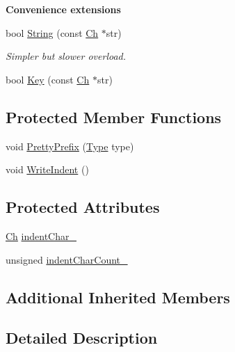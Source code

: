 \begin{Indent}{\bf Convenience extensions}\par
\begin{DoxyCompactItemize}
\item 
bool \hyperlink{classPrettyWriter_ac6ef0185174838b7034b4183013ee073}{String} (const \hyperlink{classPrettyWriter_ae5f474c0f087932d795c1cb4b9d0c312}{Ch} $\ast$str)
\begin{DoxyCompactList}\small\item\em Simpler but slower overload. \end{DoxyCompactList}\item 
bool \hyperlink{classPrettyWriter_a0a4859ad940668cf33d18b144e5e1cdd}{Key} (const \hyperlink{classPrettyWriter_ae5f474c0f087932d795c1cb4b9d0c312}{Ch} $\ast$str)
\end{DoxyCompactItemize}
\end{Indent}
\subsection*{Protected Member Functions}
\begin{DoxyCompactItemize}
\item 
void \hyperlink{classPrettyWriter_a7841433d45abbfc5a1799be0ca1ed792}{Pretty\+Prefix} (\hyperlink{rapidjson_8h_a1d1cfd8ffb84e947f82999c682b666a7}{Type} type)
\item 
void \hyperlink{classPrettyWriter_a649ec900d77960e085f76bb4d3c351d9}{Write\+Indent} ()
\end{DoxyCompactItemize}
\subsection*{Protected Attributes}
\begin{DoxyCompactItemize}
\item 
\hyperlink{classPrettyWriter_ae5f474c0f087932d795c1cb4b9d0c312}{Ch} \hyperlink{classPrettyWriter_a2cee1f24795fd6c56420df31d336c41d}{indent\+Char\+\_\+}
\item 
unsigned \hyperlink{classPrettyWriter_ab2cffe9d93ce8a4890f927832f00d9f1}{indent\+Char\+Count\+\_\+}
\end{DoxyCompactItemize}
\subsection*{Additional Inherited Members}


\subsection{Detailed Description}

